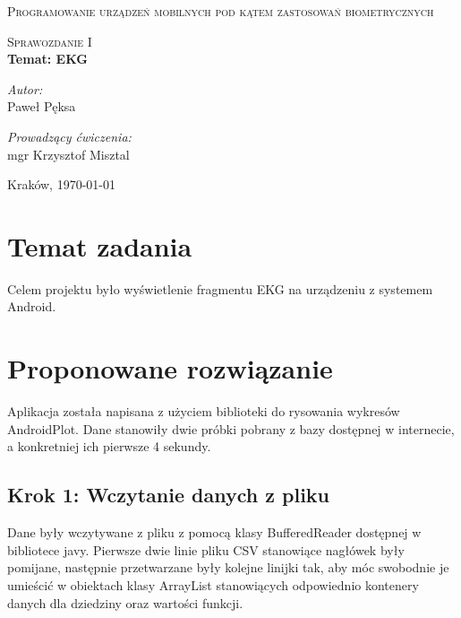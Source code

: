 \documentclass{article}
\begin{document}
\begin{titlepage}
\begin{center}

\textsc{\LARGE Programowanie urządzeń mobilnych pod kątem zastosowań biometrycznych}\\[1.5cm]

\vskip 3cm

\textsc{\Large Sprawozdanie I}\\[0.5cm]

{ \huge \bfseries Temat: EKG \\[0.4cm] }

\vskip 6cm
\begin{minipage}{0.4\textwidth}
\begin{flushleft} \large
\emph{Autor:}\\
Paweł Pęksa
\end{flushleft}
\end{minipage}
\begin{minipage}{0.4\textwidth}
\begin{flushright} \large
\emph{Prowadzący ćwiczenia:} \\
mgr Krzysztof Misztal
\end{flushright}
\end{minipage}

\vfill

{\large Kraków, \today
}

\end{center}
\end{titlepage}

\tableofcontents
\clearpage

\section{Temat zadania}
Celem projektu było wyświetlenie fragmentu EKG na urządzeniu z systemem Android.

 
\section{Proponowane rozwiązanie}
Aplikacja została napisana z użyciem biblioteki do rysowania wykresów AndroidPlot. Dane stanowiły dwie próbki pobrany z bazy dostępnej w internecie, a konkretniej ich pierwsze 4 sekundy.

\subsection{Krok 1: Wczytanie danych z pliku}
Dane były wczytywane z pliku z pomocą klasy BufferedReader dostępnej w bibliotece javy. Pierwsze dwie linie pliku CSV stanowiące nagłówek były pomijane, następnie przetwarzane były kolejne linijki tak, aby móc swobodnie je umieścić w obiektach klasy ArrayList stanowiących odpowiednio kontenery danych dla dziedziny oraz wartości funkcji.
\end{document}
